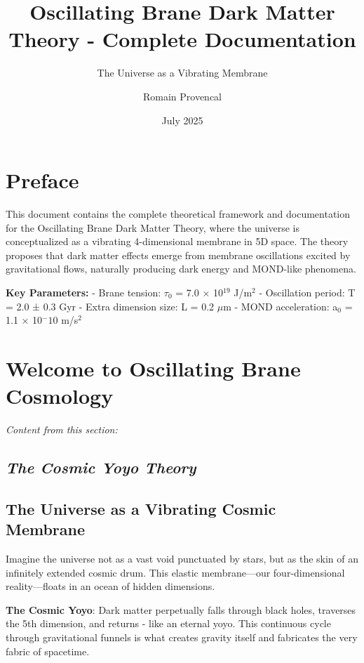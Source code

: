 \documentclass[
  11pt,
]{report}
\title{Oscillating Brane Dark Matter Theory - Complete Documentation}
\subtitle{The Universe as a Vibrating Membrane}
\author{Romain Provencal}
\date{July 2025}
\begin{document}
\maketitle

{
\hypersetup{linkcolor=}
\setcounter{tocdepth}{2}
\tableofcontents
}
\newpage

\chapter{Preface}\label{preface}

This document contains the complete theoretical framework and
documentation for the Oscillating Brane Dark Matter Theory, where the
universe is conceptualized as a vibrating 4-dimensional membrane in 5D
space. The theory proposes that dark matter effects emerge from membrane
oscillations excited by gravitational flows, naturally producing dark
energy and MOND-like phenomena.

\textbf{Key Parameters:} - Brane tension: \(\tau_0\) = 7.0 × 10\(^19\)
J/m\(^2\) - Oscillation period: T = 2.0 ± 0.3 Gyr - Extra dimension
size: L = 0.2 \(\mu\)m - MOND acceleration: a\(_0\) = 1.1 × 10\(^-10\)
m/s\(^2\)

\newpage

\chapter{Welcome to Oscillating Brane
Cosmology}\label{welcome-to-oscillating-brane-cosmology}

\emph{Content from this section:}

\section{\texorpdfstring{\emph{The Cosmic Yoyo
Theory}}{The Cosmic Yoyo Theory}}\label{the-cosmic-yoyo-theory}

\section{The Universe as a Vibrating Cosmic
Membrane}\label{the-universe-as-a-vibrating-cosmic-membrane}

Imagine the universe not as a vast void punctuated by stars, but as the
skin of an infinitely extended cosmic drum. This elastic membrane---our
four-dimensional reality---floats in an ocean of hidden dimensions.

\textbf{The Cosmic Yoyo}: Dark matter perpetually falls through black
holes, traverses the 5th dimension, and returns - like an eternal yoyo.
This continuous cycle through gravitational funnels is what creates
gravity itself and fabricates the very fabric of spacetime.
\end{document}
